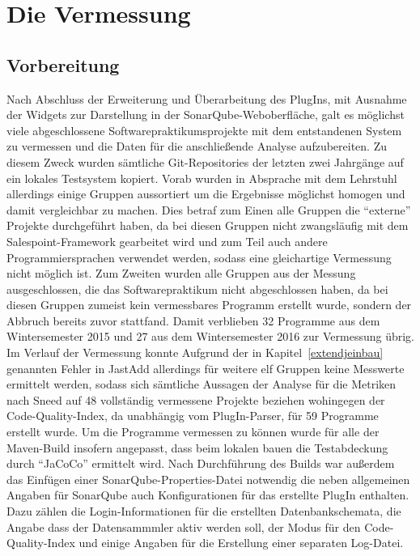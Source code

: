 \documentclass[da,ngerman]{stthesis}
\begin{document}
  	\chapter{Die Vermessung}
  		\section{Vorbereitung}
  			Nach Abschluss der Erweiterung und Überarbeitung des PlugIns, mit Ausnahme der Widgets zur Darstellung in der SonarQube-Weboberfläche, galt es möglichst viele abgeschlossene Softwarepraktikumsprojekte mit dem entstandenen System zu vermessen und die Daten für die anschließende Analyse aufzubereiten. Zu diesem Zweck wurden sämtliche Git-Repositories der letzten zwei Jahrgänge auf ein lokales Testsystem kopiert. Vorab wurden in Absprache mit dem Lehrstuhl allerdings einige Gruppen aussortiert um die Ergebnisse möglichst homogen und damit vergleichbar zu machen. Dies betraf zum Einen alle Gruppen die "`externe"' Projekte durchgeführt haben, da bei diesen Gruppen nicht zwangsläufig mit dem Salespoint-Framework gearbeitet wird und zum Teil auch andere Programmiersprachen verwendet werden, sodass eine gleichartige Vermessung nicht möglich ist. Zum Zweiten wurden alle Gruppen aus der Messung ausgeschlossen, die das Softwarepraktikum nicht abgeschlossen haben, da bei diesen Gruppen zumeist kein vermessbares Programm erstellt wurde, sondern der Abbruch bereits zuvor stattfand. Damit verblieben 32 Programme aus dem Wintersemester 2015 und 27 aus dem Wintersemester 2016 zur Vermessung übrig. Im Verlauf der Vermessung konnte Aufgrund der in Kapitel~\ref{extendjeinbau} genannten Fehler in JastAdd allerdings für weitere elf Gruppen keine Messwerte ermittelt werden, sodass sich sämtliche Aussagen der Analyse für die Metriken nach Sneed auf 48 vollständig vermessene Projekte beziehen wohingegen der Code-Quality-Index, da unabhängig vom PlugIn-Parser, für 59 Programme erstellt wurde. \newline
  			Um die Programme vermessen zu können wurde für alle der Maven-Build insofern angepasst, dass beim lokalen bauen die Testabdeckung durch "`JaCoCo"' ermittelt wird. Nach Durchführung des Builds war außerdem das Einfügen einer SonarQube-Properties-Datei notwendig die neben allgemeinen Angaben für SonarQube auch Konfigurationen für das erstellte PlugIn enthalten. Dazu zählen die Login-Informationen für die erstellten Datenbankschemata, die Angabe dass der Datensammmler aktiv werden soll, der Modus für den Code-Quality-Index und einige Angaben für die Erstellung einer separaten Log-Datei. \newline
\end{document}
